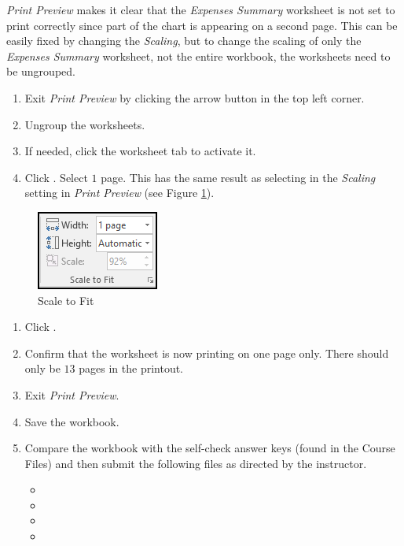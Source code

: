 \textit{Print Preview} makes it clear that the \textit{Expenses Summary} worksheet is not set to print correctly since part of the chart is appearing on a second page. This can be easily fixed by changing the \textit{Scaling}, but to change the scaling of only the \textit{Expenses Summary} worksheet, not the entire workbook, the worksheets need to be ungrouped.

\begin{enumerate}
	\item Exit \textit{Print Preview} by clicking the arrow button in the top left corner.
	\item Ungroup the worksheets.
	\item If needed, click the  worksheet tab to activate it.
	\item Click . Select $ 1 $ page. This has the same result as selecting  in the \textit{Scaling} setting in \textit{Print Preview} (see Figure \ref{06:fig16}).
\end{enumerate}

\begin{figure}[H]
	\centering
	\includegraphics[width=\maxwidth{.35\linewidth}]{gfx/ch06_fig16}
	\caption{Scale to Fit}
	\label{06:fig16}
\end{figure}

\begin{enumerate}
	\item Click .
	\item Confirm that the  worksheet is now printing on one page only. There should only be $ 13 $ pages in the printout.
	\item Exit \textit{Print Preview}.
	\item Save the  workbook.
	\item Compare the workbook with the self-check answer keys (found in the Course Files) and then submit the following files as directed by the instructor.
	
	\begin{itemize}
		\item {}
		\item {}
		\item {}
		\item {}
	\end{itemize}

\end{enumerate}

